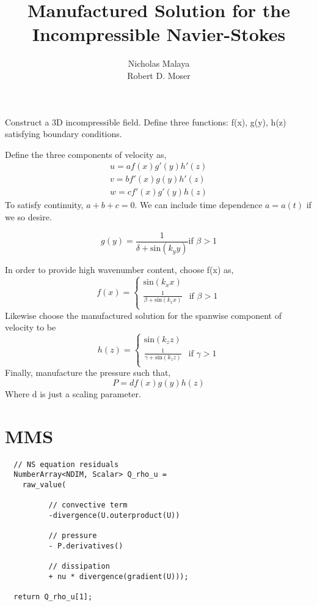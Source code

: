 \documentclass{article}
\title{\bf{Manufactured Solution for the Incompressible Navier-Stokes}}
\author{Nicholas Malaya \\ Robert D. Moser} \date{}
\begin{document}
\maketitle

Construct a 3D incompressible field. Define three functions: f(x), g(y),
h(z) satisfying boundary conditions. 

Define the three components of velocity as,
\begin{align}
u = a f(x)  g'(y)  h'(z) \\
v = b f'(x) g(y)   h'(z) \\
w = c f'(x) g'(y)  h(z) 
\end{align}
To satisfy continuity, $a+b+c=0$. We can include time dependence
$a=a(t)$ if we so desire.

\begin{equation}
 g(y) = \frac{1}{\delta + \text{sin}(k_y y)} \mbox{if } \beta > 1
\end{equation}

In order to provide high wavenumber content, choose f(x) as,
\begin{equation}
 f(x) =
  \begin{cases}
   \text{sin}(k_x x)  \\
   \frac{1}{\beta + \text{sin}(k_x x)} & \mbox{if } \beta > 1 \\
  \end{cases}
\end{equation}
Likewise choose the manufactured solution for the spanwise component of
velocity to be
\begin{equation}
 h(z) =
  \begin{cases}
   \text{sin}(k_z z)  \\
   \frac{1}{\gamma + \text{sin}(k_z z)} & \mbox{if } \gamma > 1 \\
  \end{cases}
\end{equation}
Finally, manufacture the pressure such that, 
\begin{equation}
 P = d f(x) g(y) h(z)
\end{equation}
Where d is just a scaling parameter. 
\newpage
\section{MMS}
\begin{verbatim}
  // NS equation residuals
  NumberArray<NDIM, Scalar> Q_rho_u = 
    raw_value(

	      // convective term
	      -divergence(U.outerproduct(U))

	      // pressure
	      - P.derivatives()

	      // dissipation
	      + nu * divergence(gradient(U)));

  return Q_rho_u[1];
\end{verbatim}
\end{document}
